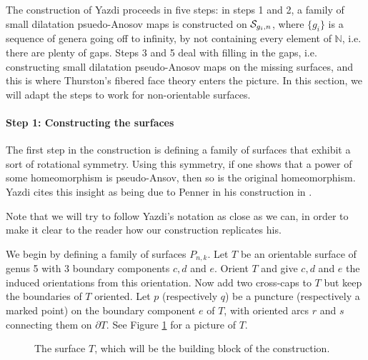 The construction of Yazdi proceeds in five steps: in steps 1 and 2, a family of small dilatation psuedo-Anosov
maps is constructed on $\mathcal{S}_{g_i,n}$, where $\{g_i\}$ is a sequence of genera going off to infinity, by not
containing every element of $\mathbb{N}$, i.e. there are plenty of gaps. Steps 3 and 5 deal with filling in the
gaps, i.e. constructing small dilatation pseudo-Anosov maps on the missing surfaces, and this is where
Thurston's fibered face theory enters the picture. In this section, we will adapt the steps to work for
non-orientable surfaces.

\paragraph{Step 1: Constructing the surfaces}

The first step in the construction is defining a family of surfaces that exhibit a sort of rotational
symmetry. Using this symmetry, if one shows that a power of some homeomorphism is pseudo-Ansov, then so is
the original homeomorphism. Yazdi cites this insight as being due to Penner in his construction in
\cite{penner1991bounds}.

Note that we will try to follow Yazdi's notation as close as we can, in order to make it clear to the reader
how our construction replicates his.

We begin by defining a family of surfaces $P_{n,k}$. Let $T$ be an orientable surface of genus 5 with 3
boundary components $c,d$ and $e$. Orient $T$ and give $c,d$ and $e$ the induced orientations from this
orientation. Now add two cross-caps to $T$ but keep the boundaries of $T$ oriented. Let $p$ (respectively $q$)
be a puncture (respectively a marked point) on the boundary component $e$ of $T$, with oriented arcs $r$ and
$s$ connecting them on $\partial T$. See Figure \ref{fig:buildingblock} for a picture of $T$.

\begin{figure}[]
    \centering
    \caption{The surface $T$, which will be the building block of the construction.}
    \label{fig:buildingblock}
\end{figure}

